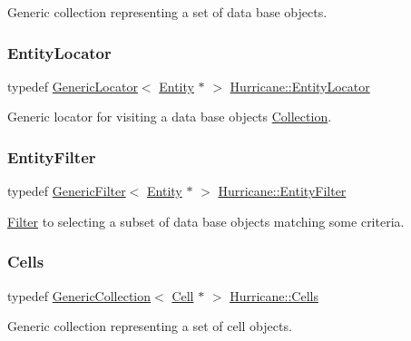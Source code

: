 Generic collection representing a set of data base objects. \mbox{\label{namespaceHurricane_ad3f039057bc40adfd993d83ace24fb83}} 
\subsubsection{\texorpdfstring{Entity\+Locator}{EntityLocator}}
{\footnotesize\ttfamily typedef \hyperlink{classHurricane_1_1GenericLocator}{Generic\+Locator}$<$ \hyperlink{classHurricane_1_1Entity}{Entity} $\ast$ $>$ \hyperlink{namespaceHurricane_ad3f039057bc40adfd993d83ace24fb83}{Hurricane\+::\+Entity\+Locator}}

Generic locator for visiting a data base objects \hyperlink{classHurricane_1_1Collection}{Collection}. \mbox{\label{namespaceHurricane_af0fe741a1ef28dedcb26bf979b1dea5c}} 
\subsubsection{\texorpdfstring{Entity\+Filter}{EntityFilter}}
{\footnotesize\ttfamily typedef \hyperlink{classHurricane_1_1GenericFilter}{Generic\+Filter}$<$ \hyperlink{classHurricane_1_1Entity}{Entity} $\ast$ $>$ \hyperlink{namespaceHurricane_af0fe741a1ef28dedcb26bf979b1dea5c}{Hurricane\+::\+Entity\+Filter}}

\hyperlink{classHurricane_1_1Filter}{Filter} to selecting a subset of data base objects matching some criteria. \mbox{\label{namespaceHurricane_a8b4ab14b26f36f43d83a50294410b44a}} 
\subsubsection{\texorpdfstring{Cells}{Cells}}
{\footnotesize\ttfamily typedef \hyperlink{classHurricane_1_1GenericCollection}{Generic\+Collection}$<$ \hyperlink{classHurricane_1_1Cell}{Cell} $\ast$ $>$ \hyperlink{namespaceHurricane_a8b4ab14b26f36f43d83a50294410b44a}{Hurricane\+::\+Cells}}

Generic collection representing a set of cell objects. \mbox{\label{namespaceHurricane_abd99adab3b5944a4d1ace3d0b0b34f57}} 
